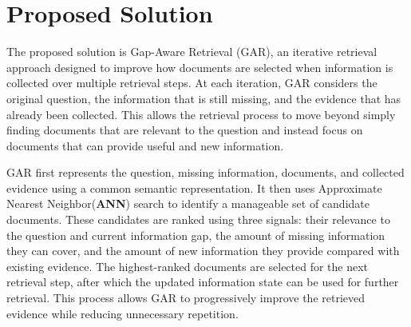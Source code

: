 \documentclass[12pt,a4paper]{report}
\begin{document}
\section{Proposed Solution}

The proposed solution is Gap-Aware Retrieval (GAR), an iterative retrieval approach designed to improve how documents are selected when information is collected over multiple retrieval steps. At each iteration, GAR considers the original question, the information that is still missing, and the evidence that has already been collected. This allows the retrieval process to move beyond simply finding documents that are relevant to the question and instead focus on documents that can provide useful and new information.

GAR first represents the question, missing information, documents, and collected evidence using a common semantic representation. It then uses Approximate Nearest Neighbor(\textbf{ANN}) search to identify a manageable set of candidate documents. These candidates are ranked using three signals: their relevance to the question and current information gap, the amount of missing information they can cover, and the amount of new information they provide compared with existing evidence. The highest-ranked documents are selected for the next retrieval step, after which the updated information state can be used for further retrieval. This process allows GAR to progressively improve the retrieved evidence while reducing unnecessary repetition.
\clearpage
\end{document}
